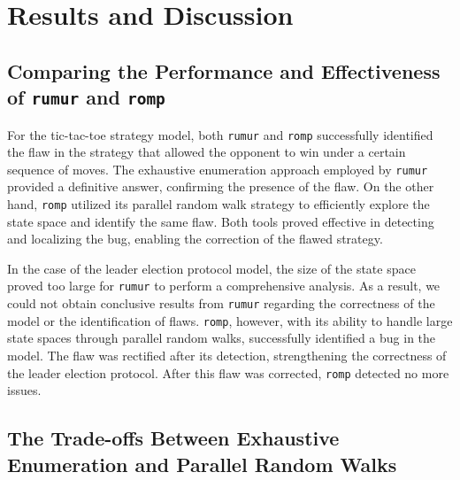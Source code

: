 
\section{Results and Discussion}\label{sec:results-and-discussion}

\subsection{Comparing the Performance and Effectiveness of \texttt{rumur} and \texttt{romp}}\label{subsec:comparing-the-performance-and-effectiveness-of-rumur-and-romp}

For the tic-tac-toe strategy model, both \texttt{rumur} and \texttt{romp}
successfully identified the flaw in the strategy that allowed the opponent to
win under a certain sequence of moves.
The exhaustive enumeration approach employed by \texttt{rumur} provided a
definitive answer, confirming the presence of the flaw.
On the other hand, \texttt{romp} utilized its parallel random walk strategy
to efficiently explore the state space and identify the same flaw.
Both tools proved effective in detecting and localizing the bug, enabling the
correction of the flawed strategy.

In the case of the leader election protocol model, the size of the state
space proved too large for \texttt{rumur} to perform a comprehensive analysis.
As a result, we could not obtain conclusive results from \texttt{rumur}
regarding the correctness of the model or the identification of flaws.
\texttt{romp}, however, with its ability to handle large state spaces through
parallel random walks, successfully identified a bug in the model.
The flaw was rectified after its detection, strengthening the correctness of
the leader election protocol.
After this flaw was corrected, \texttt{romp} detected no more issues.

\subsection{The Trade-offs Between Exhaustive Enumeration and Parallel Random Walks}\label{subsec:the-trade-offs-between-exhaustive-enumeration-and-parallel-random-walks}

